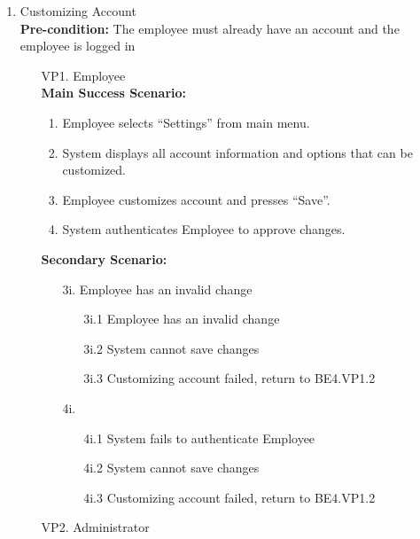 \documentclass[]{article}
\begin{document}
\begin{enumerate}[{\bf BE1.}]
\begin{enumerate}[{\bf BE4.}]
    \item Customizing Account \\ 
        \textbf{Pre-condition:} The employee must already have an account and the employee is logged in 
        \begin{enumerate}
            \item[VP1.] Employee \\
                \textbf{Main Success Scenario:}
                \begin{enumerate}
                    \item Employee selects “Settings” from main menu. 
                    \item System displays all account information and options that can be customized. 
                    \item Employee customizes account and presses “Save”. 
                    \item System authenticates Employee to approve changes. 
                \end{enumerate}
                \textbf{Secondary Scenario:}
                \begin{enumerate}
                    \item[3i.] Employee has an invalid change
                    \begin{enumerate}
                        \item[3i.1] Employee has an invalid change
                        \item[3i.2] System cannot save changes
                        \item[3i.3] Customizing account failed, return to BE4.VP1.2
                    \end{enumerate}
                    \item[4i.]
                    \begin{enumerate}
                        \item[4i.1] System fails to authenticate Employee
                        \item[4i.2] System cannot save changes
                        \item[4i.3] Customizing account failed, return to BE4.VP1.2
                    \end{enumerate}
                \end{enumerate}
            \item[VP2.] Administrator \\

\end{enumerate}
\end{enumerate}
\end{enumerate}
\end{document}
